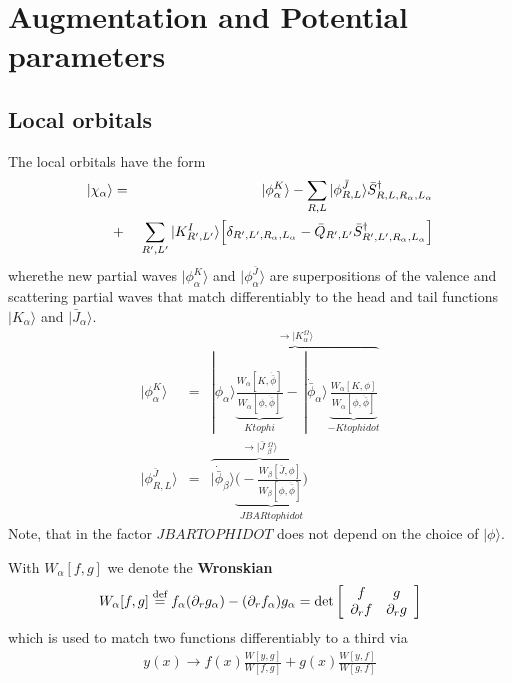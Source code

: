 \documentclass[11pt,a4paper]{report}
\begin{document}
\section{Augmentation and Potential parameters}
\subsection{Local orbitals}
The local orbitals have the form
\begin{eqnarray}
|\chi_\alpha\rangle&=&|\phi^K_\alpha\rangle
- \sum_{R,L}|\phi^{\bar{J}}_{R,L}\rangle \bar{S}^\dagger_{R,L,R_\alpha,L_\alpha}
\nonumber\\
&+&\sum_{R',L'}|K^I_{R',L'}\rangle\Bigl[ \delta_{R',L',R_\alpha,L_\alpha}-\bar{Q}_{R',L'}
\bar{S}^\dagger_{R',L',R_\alpha,L_\alpha}\Bigr]
\end{eqnarray}
wherethe new partial waves $|\phi^K_\alpha\rangle$ and
$|\phi^{\bar{J}}_\alpha\rangle$ are superpositions of the valence and
scattering partial waves that match differentiably to the head and
tail functions $|K_\alpha\rangle$ and $|\bar{J}_\alpha\rangle$.
\begin{eqnarray}
|\phi^K_\alpha\rangle&=&
\overbrace{
|\phi_\alpha\rangle 
\underbrace{
\frac{W_\alpha[K,\dot{\bar{\phi}}]}{W_\alpha[\phi,\dot{\bar{\phi}}]}}_{Ktophi}
-\,|\dot{\bar{\phi}}_\alpha\rangle 
\underbrace{\frac{W_\alpha[K,\phi]}{W_\alpha[\phi,\dot{\bar{\phi}}]}}_{-Ktophidot}
}^{\rightarrow |K^\Omega_\alpha\rangle}
\nonumber\\
|\phi^{\bar{J}}_{R,L}\rangle
&=&\overbrace{
|\dot{\bar{\phi}}_\beta\rangle 
\underbrace{\biggl(-\frac{W_\beta[\bar{J},\phi]}{W_\beta[\phi,\dot{\bar{\phi}}]}\biggr)}_{JBARtophidot}
}^{\rightarrow |\bar{J}\;^\Omega_\beta\rangle}
\end{eqnarray}
Note, that in the factor $JBARTOPHIDOT$ does not depend on the choice
of $|\phi\rangle$.

With $W_\alpha[f,g]$ we denote the \textbf{Wronskian}
\begin{eqnarray}
W_\alpha[f,g]\stackrel{\text{def}}{=} f_\alpha (\partial_r g_\alpha)-(\partial_r f_\alpha)g_\alpha
=\det\left[\begin{array}{cc}f&g\\\partial_rf&\partial_rg\end{array}\right]
\end{eqnarray}
which is used to match two functions differentiably to a third via
\begin{eqnarray}
y(x)\rightarrow f(x)\frac{W[y,g]}{W[f,g]}+g(x)\frac{W[y,f]}{W[g,f]}
\end{eqnarray}
\end{document}
